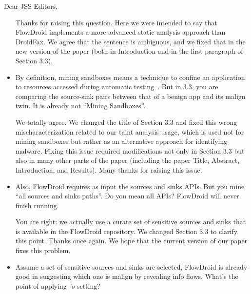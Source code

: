 \documentclass[12pt,english]{scrartcl}
\begin{document}
\begin{letter}{Dear JSS Editors,}
\begin{itemize}
\vspace{0.2cm}

{\color{blue}{\bf Answer.} Thanks for raising this question. Here we were intended to say that FlowDroid implements a more advanced static analysis approach than DroidFax. We agree that the sentence is ambiguous, and we fixed that in the new version of the paper (both in Introduction and in the first paragraph
  of Section 3.3).}

\vspace{0.2cm}

\item By definition, mining sandboxes means a technique to confine an application to resources accessed during automatic 
testing~\cite{jamrozikZ16}. But in 3.3, you are comparing the source-sink pairs between that of a benign app and its malign twin. It is already not ``Mining Sandboxes''.

\vspace{0.2cm}

{\color{blue}{\bf Answer.} We totally agree. We changed the title of Section 3.3 and fixed this wrong mischaracterization related to our taint analysis usage, which is used not for mining sandboxes but rather as an alternative approach for identifying malware. Fixing this issue required modifications not only in Section 3.3 but also in many other parts of the paper (including the paper Title, Abstract, Introduction, and Results). Many thanks for raising this issue.}


\vspace{0.2cm}

\item Also, FlowDroid requires as input the sources and sinks APIs. But you mine ``all sources and sinks 
paths''. Do you mean all APIs? FlowDroid will never finish running. 

\vspace{0.2cm}

{\color{blue}{\bf Answer.} You are right: we actually use a curate set of sensitive sources and sinks
  that is available in the FlowDroid repository.
  We changed Section 3.3 to clarify this point. Thanks once again.
  We hope that the current version of our paper fixes this problem.}

\vspace{0.2cm}
  
\item Assume a set of sensitive sources and sinks are selected, 
  FlowDroid is already good in suggesting which one is malign by revealing info flows. What's the point of
  applying~\cite{jamrozikZ16}'s setting?



\end{itemize}
\end{letter}
\end{document}
